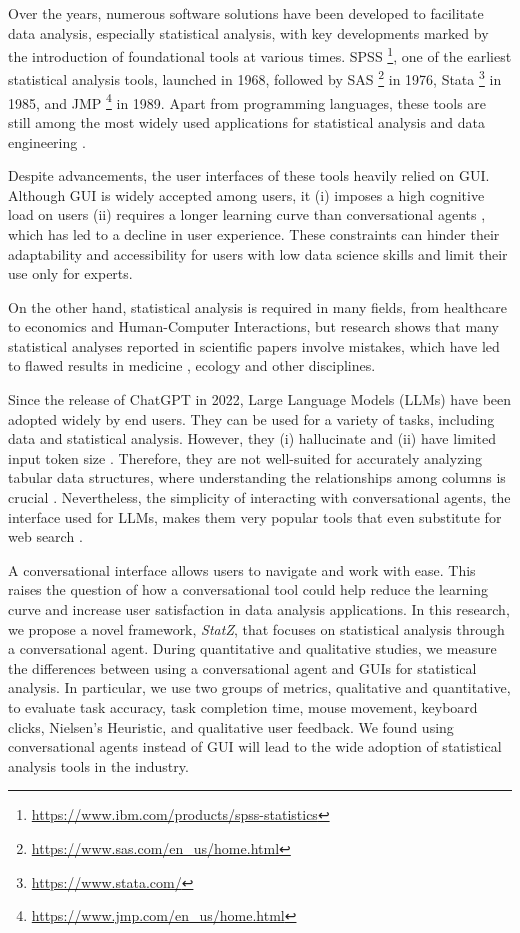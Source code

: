\documentclass{article}
\begin{document}
Over the years, numerous software solutions have been developed to facilitate data analysis, especially statistical analysis, with key developments marked by the introduction of foundational tools at various times. SPSS \footnote{\url{https://www.ibm.com/products/spss-statistics}}, one of the earliest statistical analysis tools, launched in 1968, followed by SAS \footnote{\url{https://www.sas.com/en_us/home.html}} in 1976, Stata \footnote{\url{https://www.stata.com/}} in 1985, and JMP \footnote{\url{https://www.jmp.com/en_us/home.html}} in 1989. Apart from programming languages, these tools are still among the most widely used applications for statistical analysis and data engineering \cite{Muenchen2023}.

Despite advancements, the user interfaces of these tools heavily relied on GUI. Although GUI is widely accepted among users, it (i) imposes a high cognitive load on users \cite{Darejeh2024} (ii) requires a longer learning curve than conversational agents \cite{Rawassizadeh2023}, which has led to a decline in user experience. These constraints can hinder their adaptability and accessibility for users with low data science skills and limit their use only for experts. 
   
On the other hand, statistical analysis is required in many fields, from healthcare to economics and Human-Computer Interactions, but research shows that many statistical analyses reported in scientific papers involve mistakes, which have led to flawed results in medicine \cite{Strasak2007}, ecology \cite{Spake2023} and other disciplines.

Since the release of ChatGPT in 2022, Large Language Models (LLMs) have been adopted widely by end users. They can be used for a variety of tasks, including data and statistical analysis. However, they (i) hallucinate and (ii) have limited input token size \cite{brown2020language}. Therefore, they are not well-suited for accurately analyzing tabular data structures, where understanding the relationships among columns is crucial \cite{Zhang2024}. Nevertheless, the simplicity of interacting with conversational agents, the interface used for LLMs, makes them very popular tools that even substitute for web search \cite{xu2023}. 

A conversational interface allows users to navigate and work with ease. This raises the question of how a conversational tool could help reduce the learning curve and increase user satisfaction in data analysis applications. In this research, we propose a novel framework, \emph{\textit{StatZ}}, that focuses on statistical analysis through a conversational agent. During quantitative and qualitative studies, we measure the differences between using a conversational agent and GUIs for statistical analysis. In particular, we use two groups of metrics, qualitative and quantitative, to evaluate task accuracy, task completion time, mouse movement, keyboard clicks, Nielsen's Heuristic, and qualitative user feedback. We found using conversational agents instead of GUI will lead to the wide adoption of statistical analysis tools in the industry. 
\end{document}
